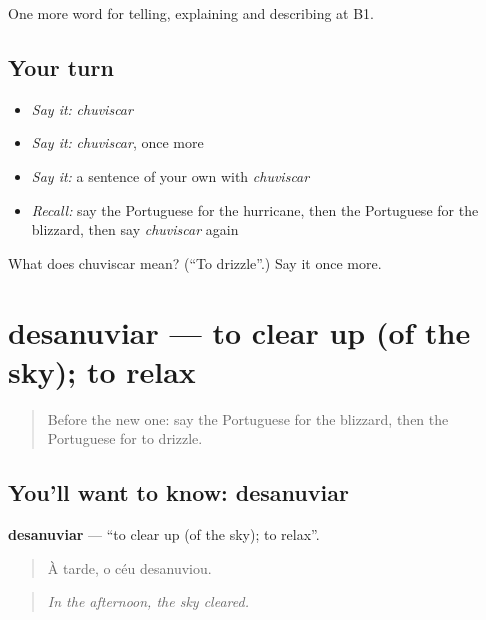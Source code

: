 \begin{grammarlens}[title={What you've built}]
One more word for telling, explaining and describing at B1.
\end{grammarlens}

\subsection*{Your turn}
\begin{itemize}
\raggedright
  \item \emph{Say it:} \emph{chuviscar}
  \item \emph{Say it:} \emph{chuviscar}, once more
  \item \emph{Say it:} a sentence of your own with \emph{chuviscar}
  \item \emph{Recall:} say the Portuguese for the hurricane, then the Portuguese for the blizzard, then say \emph{chuviscar} again
\end{itemize}

\begin{tcolorbox}[breakable,colback=teal!4,colframe=teal!35!black,title={Before you move on}]
What does chuviscar mean? (\textquotedblleft{}To drizzle\textquotedblright{}.) Say it once more.
\end{tcolorbox}
\section[desanuviar]{desanuviar — to clear up (of the sky); to relax}

\label{lesson:PT-C466-desanuviar}



\begin{quote}
Before the new one: say the Portuguese for the blizzard, then the Portuguese for to drizzle.
\end{quote}

\subsection*{You'll want to know: desanuviar}
\textbf{desanuviar} — \textquotedblleft{}to clear up (of the sky); to relax\textquotedblright{}.

\begin{quote}
À tarde, o céu desanuviou.
\end{quote}

\begin{quote}
\emph{In the afternoon, the sky cleared.}
\end{quote}

